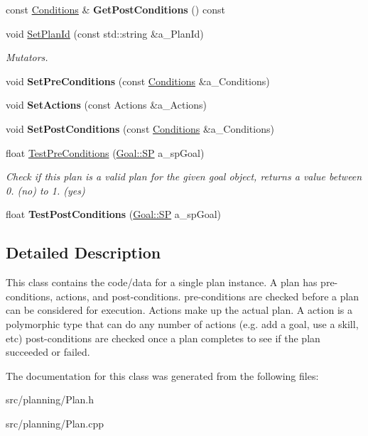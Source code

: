\begin{DoxyCompactItemize}
\mbox{\label{class_plan_a49a7875f998eab1657ca2272549cb903}} 
const \hyperlink{class_plan_aa0455bd3e1ec9a820f31ef52706fdf76}{Conditions} \& {\bfseries Get\+Post\+Conditions} () const
\item 
\mbox{\label{class_plan_a749cf2773ba0514aa05cc29b38203873}} 
void \hyperlink{class_plan_a749cf2773ba0514aa05cc29b38203873}{Set\+Plan\+Id} (const std\+::string \&a\+\_\+\+Plan\+Id)
\begin{DoxyCompactList}\small\item\em Mutators. \end{DoxyCompactList}\item 
\mbox{\label{class_plan_a7bd37af59ecbe2603310a467dda091ff}} 
void {\bfseries Set\+Pre\+Conditions} (const \hyperlink{class_plan_aa0455bd3e1ec9a820f31ef52706fdf76}{Conditions} \&a\+\_\+\+Conditions)
\item 
\mbox{\label{class_plan_a67bdb03ad0b61ddd7ea21c815fc78443}} 
void {\bfseries Set\+Actions} (const Actions \&a\+\_\+\+Actions)
\item 
\mbox{\label{class_plan_a88fd731f14b0ebeaab4c0cb935e4b00d}} 
void {\bfseries Set\+Post\+Conditions} (const \hyperlink{class_plan_aa0455bd3e1ec9a820f31ef52706fdf76}{Conditions} \&a\+\_\+\+Conditions)
\item 
\mbox{\label{class_plan_a5979d7915c891ec9b92b49afb1856a13}} 
float \hyperlink{class_plan_a5979d7915c891ec9b92b49afb1856a13}{Test\+Pre\+Conditions} (\hyperlink{class_goal_a818ae12a4d1f28bd433dab2a830a390e}{Goal\+::\+SP} a\+\_\+sp\+Goal)
\begin{DoxyCompactList}\small\item\em Check if this plan is a valid plan for the given goal object, returns a value between 0. (no) to 1. (yes) \end{DoxyCompactList}\item 
\mbox{\label{class_plan_ad4fec82bbd1b2e48a4d2d00f47e5ebcf}} 
float {\bfseries Test\+Post\+Conditions} (\hyperlink{class_goal_a818ae12a4d1f28bd433dab2a830a390e}{Goal\+::\+SP} a\+\_\+sp\+Goal)
\end{DoxyCompactItemize}


\subsection{Detailed Description}
This class contains the code/data for a single plan instance. A plan has pre-\/conditions, actions, and post-\/conditions. pre-\/conditions are checked before a plan can be considered for execution. Actions make up the actual plan. A action is a polymorphic type that can do any number of actions (e.\+g. add a goal, use a skill, etc) post-\/conditions are checked once a plan completes to see if the plan succeeded or failed. 

The documentation for this class was generated from the following files\+:\begin{DoxyCompactItemize}
\item 
src/planning/Plan.\+h\item 
src/planning/Plan.\+cpp\end{DoxyCompactItemize}

